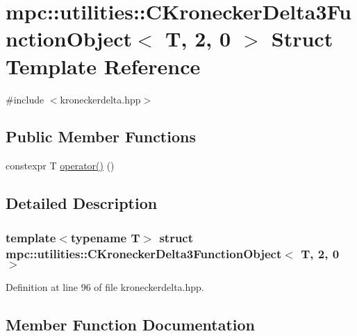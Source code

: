 \hypertarget{structmpc_1_1utilities_1_1_c_kronecker_delta3_function_object_3_01_t_00_012_00_010_01_4}{}\section{mpc\+:\+:utilities\+:\+:C\+Kronecker\+Delta3\+Function\+Object$<$ T, 2, 0 $>$ Struct Template Reference}
\label{structmpc_1_1utilities_1_1_c_kronecker_delta3_function_object_3_01_t_00_012_00_010_01_4}


{\ttfamily \#include $<$kroneckerdelta.\+hpp$>$}

\subsection*{Public Member Functions}
\begin{DoxyCompactItemize}
\item 
constexpr T \mbox{\hyperlink{structmpc_1_1utilities_1_1_c_kronecker_delta3_function_object_3_01_t_00_012_00_010_01_4_ab9ff8a657aa5e996e3acadd2589f1394}{operator()}} ()
\end{DoxyCompactItemize}


\subsection{Detailed Description}
\subsubsection*{template$<$typename T$>$\newline
struct mpc\+::utilities\+::\+C\+Kronecker\+Delta3\+Function\+Object$<$ T, 2, 0 $>$}



Definition at line 96 of file kroneckerdelta.\+hpp.



\subsection{Member Function Documentation}
\mbox{\label{structmpc_1_1utilities_1_1_c_kronecker_delta3_function_object_3_01_t_00_012_00_010_01_4_ab9ff8a657aa5e996e3acadd2589f1394}} 
